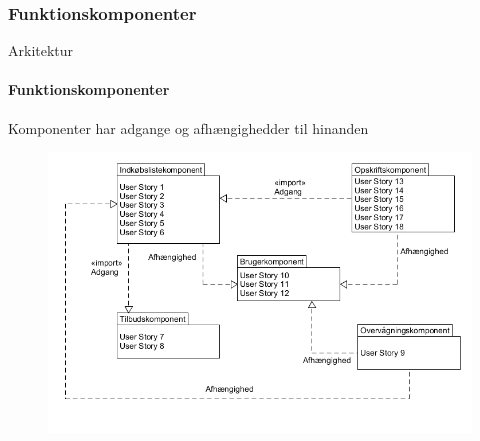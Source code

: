 		\subsubsection{Funktionskomponenter}
		\begin{frame}[t]{Arkitektur}\framesubtitle{Funktionskomponenter}
			Komponenter har adgange og afhængighedder til hinanden
			\hspace{-20pt}
			\begin{figure}[h!]
				\centering
				\includegraphics[width=1\textwidth]{images/Komponenter.png} %
			\end{figure}
		\end{frame}

